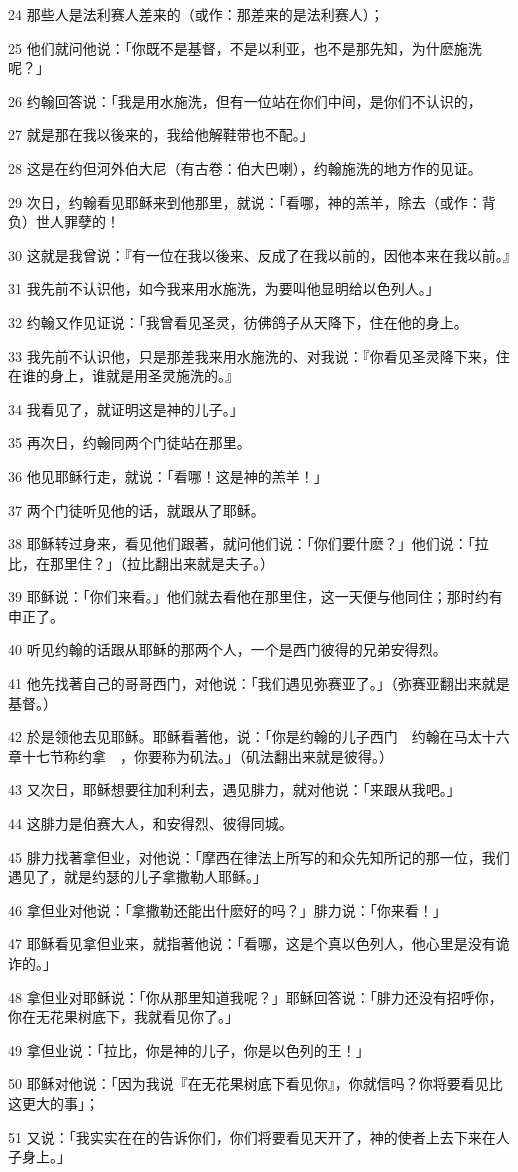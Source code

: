 \par 24 那些人是法利赛人差来的（或作：那差来的是法利赛人）；
\par 25 他们就问他说：「你既不是基督，不是以利亚，也不是那先知，为什麽施洗呢？」
\par 26 约翰回答说：「我是用水施洗，但有一位站在你们中间，是你们不认识的，
\par 27 就是那在我以後来的，我给他解鞋带也不配。」
\par 28 这是在约但河外伯大尼（有古卷：伯大巴喇），约翰施洗的地方作的见证。
\par 29 次日，约翰看见耶稣来到他那里，就说：「看哪，神的羔羊，除去（或作：背负）世人罪孽的！
\par 30 这就是我曾说：『有一位在我以後来、反成了在我以前的，因他本来在我以前。』
\par 31 我先前不认识他，如今我来用水施洗，为要叫他显明给以色列人。」
\par 32 约翰又作见证说：「我曾看见圣灵，彷佛鸽子从天降下，住在他的身上。
\par 33 我先前不认识他，只是那差我来用水施洗的、对我说：『你看见圣灵降下来，住在谁的身上，谁就是用圣灵施洗的。』
\par 34 我看见了，就证明这是神的儿子。」
\par 35 再次日，约翰同两个门徒站在那里。
\par 36 他见耶稣行走，就说：「看哪！这是神的羔羊！」
\par 37 两个门徒听见他的话，就跟从了耶稣。
\par 38 耶稣转过身来，看见他们跟著，就问他们说：「你们要什麽？」他们说：「拉比，在那里住？」（拉比翻出来就是夫子。）
\par 39 耶稣说：「你们来看。」他们就去看他在那里住，这一天便与他同住；那时约有申正了。
\par 40 听见约翰的话跟从耶稣的那两个人，一个是西门彼得的兄弟安得烈。
\par 41 他先找著自己的哥哥西门，对他说：「我们遇见弥赛亚了。」（弥赛亚翻出来就是基督。）
\par 42 於是领他去见耶稣。耶稣看著他，说：「你是约翰的儿子西门　约翰在马太十六章十七节称约拿　，你要称为矶法。」（矶法翻出来就是彼得。）
\par 43 又次日，耶稣想要往加利利去，遇见腓力，就对他说：「来跟从我吧。」
\par 44 这腓力是伯赛大人，和安得烈、彼得同城。
\par 45 腓力找著拿但业，对他说：「摩西在律法上所写的和众先知所记的那一位，我们遇见了，就是约瑟的儿子拿撒勒人耶稣。」
\par 46 拿但业对他说：「拿撒勒还能出什麽好的吗？」腓力说：「你来看！」
\par 47 耶稣看见拿但业来，就指著他说：「看哪，这是个真以色列人，他心里是没有诡诈的。」
\par 48 拿但业对耶稣说：「你从那里知道我呢？」耶稣回答说：「腓力还没有招呼你，你在无花果树底下，我就看见你了。」
\par 49 拿但业说：「拉比，你是神的儿子，你是以色列的王！」
\par 50 耶稣对他说：「因为我说『在无花果树底下看见你』，你就信吗？你将要看见比这更大的事」；
\par 51 又说：「我实实在在的告诉你们，你们将要看见天开了，神的使者上去下来在人子身上。」


